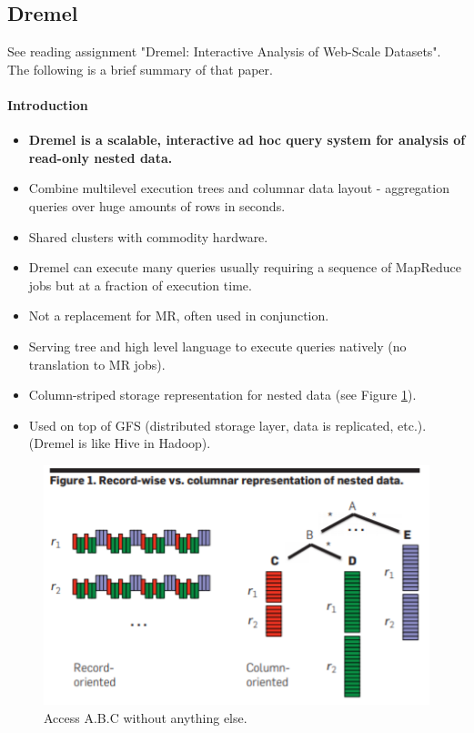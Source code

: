 \subsection{Dremel}

See reading assignment "Dremel: Interactive Analysis of Web-Scale Datasets". The following is a brief summary of that paper.

\paragraph{Introduction}
\begin{itemize}
    \item \textbf{Dremel is a scalable, interactive ad hoc query system for analysis of read-only nested data.}
    \item Combine multilevel execution trees and columnar data layout - aggregation queries over huge amounts of rows in seconds.
    \item Shared clusters with commodity hardware.
    \item Dremel can execute many queries usually requiring a sequence of MapReduce jobs but at a fraction of execution time.
    \item Not a replacement for MR, often used in conjunction.
    \item Serving tree and high level language to execute queries natively (no translation to MR jobs).
    \item Column-striped storage representation for nested data (see Figure \ref{fig:dremel}).
    \item Used on top of GFS (distributed storage layer, data is replicated, etc.). (Dremel is like Hive in Hadoop).
\end{itemize}

\begin{figure}[h]
	\centering
	\includegraphics[scale=0.7]{images/3-dremel.PNG}
	\caption{Access A.B.C without anything else.}
	\label{fig:dremel}
\end{figure}


